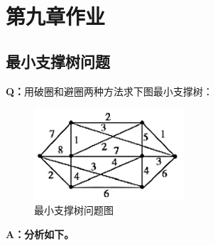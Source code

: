 \ifx\allfiles\undefined

    
    
\else
\fi
\section{第九章作业}
\subsection{最小支撑树问题}
\textbf{Q：}用破圈和避圈两种方法求下图最小支撑树：
\begin{figure}[H]
    \centering
    \includegraphics[width=0.5\textwidth]{./image/41.png}
    \caption{最小支撑树问题图}
    \label{fig:Chapter4_Temporary_Pavilion_1}
\end{figure}
\textbf{A：分析如下。}
